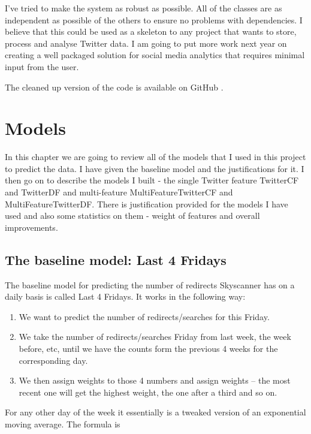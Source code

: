 \documentclass[minf,twoside,singlespacing,parskip,frontabs]{infthesis}
\begin{document}
I've tried to make the system as robust as possible. All of the classes are as independent as possible of the others to ensure no problems with dependencies. I believe that this could be used as a skeleton to any project that wants to store, process and analyse Twitter data. I am going to put more work next year on creating a well packaged solution for social media analytics that requires minimal input from the user.

The cleaned up version of the code is available on GitHub \cite{code}.



\chapter{Models}
\label{chap:model}


In this chapter we are going to review all of the models that I used in this project to predict the data. I have given the baseline model and the justifications for it. I then go on to describe the models I built - the single Twitter feature TwitterCF and TwitterDF and multi-feature MultiFeatureTwitterCF and MultiFeatureTwitterDF. There is justification provided for the models I have used and also some statistics on them - weight of features and overall improvements. 


\section{The baseline model: Last 4 Fridays}
\label{sec:baseline}

The baseline model for predicting the number of redirects Skyscanner has on a daily basis is called Last 4 Fridays. 
It works in the following way:
\begin{enumerate}
\item We want to predict the number of redirects/searches for this Friday.
\item We take the number of redirects/searches Friday from last week, the week before, etc, until we have the counts form the previous 4 weeks for the corresponding day.
\item We then assign weights to those 4 numbers and assign weights -- the most recent one will get the highest weight, the one after a third and so on.
\end{enumerate}

For any other day of the week it essentially is a tweaked version of an exponential moving average. The formula is
\end{document}

